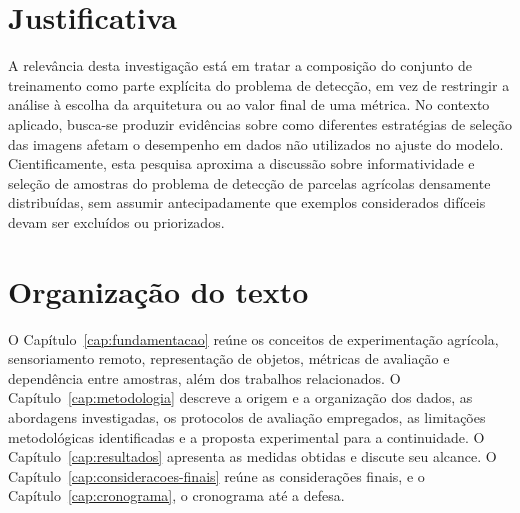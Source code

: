 \section{Justificativa}
\label{sec:justificativa}

A relev\^ancia desta investiga\c{c}\~ao est\'a em tratar a composi\c{c}\~ao do conjunto de treinamento como parte expl\'icita do problema de detec\c{c}\~ao, em vez de restringir a an\'alise \`a escolha da arquitetura ou ao valor final de uma m\'etrica. No contexto aplicado, busca-se produzir evid\^encias sobre como diferentes estrat\'egias de sele\c{c}\~ao das imagens afetam o desempenho em dados n\~ao utilizados no ajuste do modelo. Cientificamente, esta pesquisa aproxima a discuss\~ao sobre informatividade e sele\c{c}\~ao de amostras do problema de detec\c{c}\~ao de parcelas agr\'icolas densamente distribu\'idas, sem assumir antecipadamente que exemplos considerados dif\'iceis devam ser exclu\'idos ou priorizados.

\section{Organiza\c{c}\~ao do texto}
\label{sec:organizacao-texto}

O Cap\'itulo~\ref{cap:fundamentacao} re\'une os conceitos de experimenta\c{c}\~ao agr\'icola, sensoriamento remoto, representa\c{c}\~ao de objetos, m\'etricas de avalia\c{c}\~ao e depend\^encia entre amostras, al\'em dos trabalhos relacionados. O Cap\'itulo~\ref{cap:metodologia} descreve a origem e a organiza\c{c}\~ao dos dados, as abordagens investigadas, os protocolos de avalia\c{c}\~ao empregados, as limita\c{c}\~oes metodol\'ogicas identificadas e a proposta experimental para a continuidade. O Cap\'itulo~\ref{cap:resultados} apresenta as medidas obtidas e discute seu alcance. O Cap\'itulo~\ref{cap:consideracoes-finais} re\'une as considera\c{c}\~oes finais, e o Cap\'itulo~\ref{cap:cronograma}, o cronograma at\'e a defesa.
